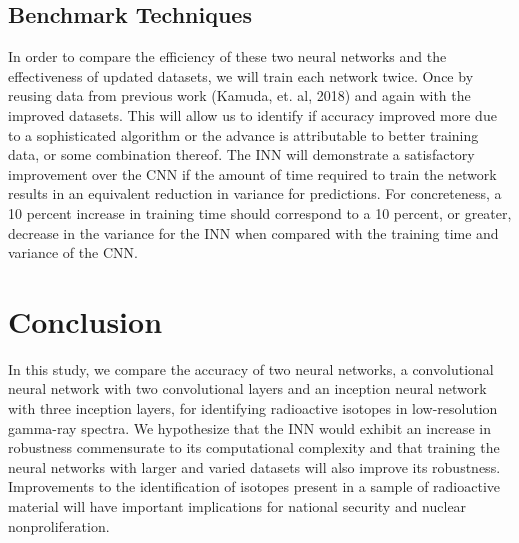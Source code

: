 \documentclass[11pt]{article}
\begin{document}
\subsection{Benchmark Techniques}
In order to compare the efficiency of these two neural networks and the effectiveness of updated datasets, we will train each network twice. 
Once by reusing data from previous work (Kamuda, et. al,  2018) and again with the improved datasets. 
This will allow us to identify if accuracy improved more due to a sophisticated algorithm or the advance is attributable to better training data, or some combination thereof. 
The INN will demonstrate a satisfactory improvement over the CNN if the amount of time required to train the network results in an equivalent reduction in variance for predictions. 
For concreteness, a 10 percent increase in training time should correspond to a 10 percent, or greater, decrease in the variance for the INN when compared with the training time and variance of the CNN.

\section{Conclusion}

In this study, we compare the accuracy of two neural networks, a convolutional neural network with two convolutional layers and an inception neural network with three inception layers, for identifying radioactive isotopes in low-resolution gamma-ray spectra. 
We hypothesize that the INN would exhibit an increase in robustness commensurate to its computational complexity and that training the neural networks with larger and varied datasets will also improve its robustness. 
Improvements to the identification of isotopes present in a sample of radioactive material will have important implications for national security and nuclear nonproliferation.


\end{document}
